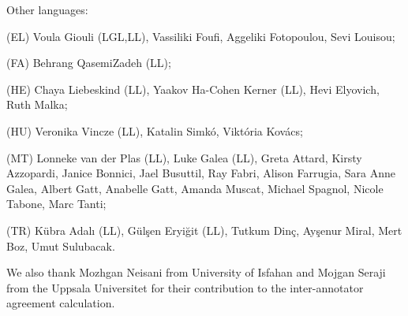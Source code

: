 \documentclass[output=paper,
modfonts,
]{langscibook}
\begin{document}
\noindent Other languages:
 \begin{sitem}
 \item (EL) Voula Giouli (LGL,LL), Vassiliki Foufi, Aggeliki Fotopoulou, Sevi Loui\-sou;
 \item (FA) Behrang QasemiZadeh (LL);
 \item (HE) Chaya Liebeskind (LL), Yaakov Ha-Cohen Kerner (LL), Hevi Elyovich, Ruth Malka;
 \item (HU) Veronika Vincze (LL), Katalin Simkó, Viktória Kovács;
 \item (MT) Lonneke van der Plas (LL), Luke Galea (LL), Greta Attard, Kirsty Azzopardi, Janice Bonnici, Jael Busuttil, Ray Fabri, Alison Farrugia, Sara Anne Galea, Albert Gatt, Anabelle Gatt, Amanda Muscat,  Michael Spagnol, Nicole Tabone, Marc Tanti;
 \item (TR) Kübra Adalı (LL), Gülşen Eryiğit (LL), Tutkum Dinç, Ayşenur Miral, Mert Boz, Umut Sulubacak.
 \end{sitem}
 
We also thank Mozhgan Neisani from University of Isfahan and Mojgan Seraji from the Uppsala Universitet for their contribution to the inter-annotator agreement calculation.

\newpage
\end{document}
